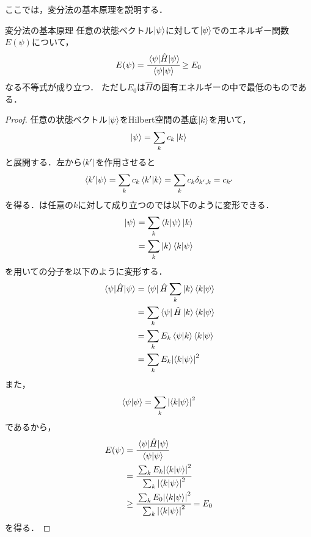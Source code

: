 \documentclass{report}
\begin{document}
  ここでは，変分法の基本原理を説明する．
  \begin{itembox}[l]{変分法の基本原理}
    任意の状態ベクトル$\ket{\psi}$に対して$\ket{\psi}$でのエネルギー関数$E(\psi)$について，
    \begin{align}
      E(\psi) = \cfrac{\mel{\psi}{\hat{H}}{\psi}}{\braket{\psi}} \geq E_0 \label{minimum}
    \end{align}
    なる不等式が成り立つ．
    ただし$E_0$は$\hat{H}$の固有エネルギーの中で最低のものである．
  \end{itembox}
  \begin{proof}
    任意の状態ベクトル$\ket{\psi}$をHilbert空間の基底$\ket{k}$を用いて，
    \begin{align}
      \ket{\psi} = \sum_{k} c_k\ket{k} \label{basis_expansion}
    \end{align}
    と展開する．左から$\bra{k'}$を作用させると
    \begin{align}
      \braket{k'}{\psi} = \sum_{k}c_k\bra{k'}\ket{k} = \sum_{k}c_k\delta_{k',k} = c_{k'} \label{basis_expansion2}
    \end{align}
    を得る．は任意の$k$に対して成り立つのでは以下のように変形できる．
    \begin{align}
      \ket{\psi} &= \sum_{k}\braket{k}{\psi}\ket{k}\\
      &= \sum_{k}\ket{k}\bra{k}\ket{\psi} \label{basis_expansion3}
    \end{align}
    を用いての分子を以下のように変形する．
    \begin{align}
      \mel{\psi}{\hat{H}}{{\psi}} &= \bra{\psi}\hat{H}\sum_{k}\ket{k}\braket{k}{\psi}\\
      &= \sum_{k}\bra{\psi}\hat{H}\ket{k}\braket{k}{\psi} \\
      &= \sum_{k}E_k\bra{\psi}\ket{k}\braket{k}{\psi} \\
      &= \sum_{k}E_k\abs{\braket{k}{\psi}}^2
    \end{align}
    また，
    \begin{align}
      \braket{\psi}{\psi}=\sum_{k}\abs{\braket{k}{\psi}}^2
    \end{align}
    であるから，
    \begin{align}
      E(\psi) &= \cfrac{\mel{\psi}{\hat{H}}{\psi}}{\braket{\psi}{\psi} } \\ 
      &= \cfrac{\sum_{k}E_k\abs{\braket{k}{\psi}}^2}{\sum_{k}\abs{\braket{k}{\psi}}^2} \\ 
      &\geq \cfrac{\sum_{k}E_0\abs{\braket{k}{\psi}}^2}{\sum_{k}\abs{\braket{k}{\psi}}^2} = E_0
    \end{align}
    を得る．
  \end{proof}
\end{document}
